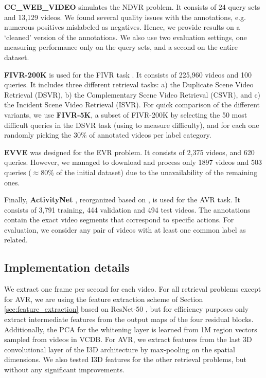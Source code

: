 \documentclass[10pt,twocolumn,letterpaper]{article}
\begin{document}
\textbf{CC\_WEB\_VIDEO} \cite{wu2007} simulates the NDVR problem. It consists of 24 query sets and 13,129 videos. We found several quality issues with the annotations, e.g. numerous positives mislabeled as negatives. Hence, we provide results on a `cleaned' version of the annotations. We also use two evaluation settings, one measuring performance only on the query sets, and a second  on the entire dataset. 

\textbf{FIVR-200K} is used for the FIVR task \cite{kordopatis2018}. It consists of 225,960 videos and 100 queries. It includes three different retrieval tasks: a) the Duplicate Scene Video Retrieval (DSVR), b) the Complementary Scene Video Retrieval (CSVR), and c) the Incident Scene Video Retrieval (ISVR).
For quick comparison of the different variants, we use \textbf{FIVR-5K}, a subset of FIVR-200K by selecting the 50 most difficult queries in the DSVR task (using \cite{kordopatis2017a} to measure difficulty), and for each one  randomly picking the 30\% of annotated videos per label category. 





\textbf{EVVE} \cite{revaud2013} was designed for the EVR problem. It consists of 2,375 videos, and 620 queries. However, we managed to download and process only 1897 videos and 503 queries ($\approx$80\% of the initial dataset) due to the unavailability of the remaining ones. 

Finally, \textbf{ActivityNet} \cite{caba2015}, reorganized based on \cite{feng2018}, is used for the AVR task. It consists of 3,791 training, 444 validation and 494 test videos. The annotations contain the exact video segments that correspond to specific actions. For evaluation, we consider any pair of videos with at least one common label as related. 





\subsection{Implementation details}
\label{sec:experiments}

We extract one frame per second for each video. For all retrieval problems except for AVR, we are using the feature extraction scheme of Section \ref{sec:feature_extraction} based on ResNet-50 \cite{he2016},
but for efficiency purposes only extract intermediate features from the output maps of the four residual blocks. Additionally, the PCA for the whitening layer is learned from 1M region vectors sampled from videos in VCDB. For AVR, we extract features from the last 3D convolutional layer of the I3D architecture \cite{carreira2017} by max-pooling on the spatial dimensions. We also tested I3D features for the other retrieval problems, but without any significant improvements.
\end{document}
